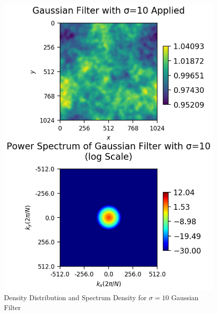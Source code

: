 \documentclass[a4paper,10pt]{article}
\begin{document}
\begin{large}
\begin{figure}[htbp] %
\centering %
\includegraphics[width=14cm]{sigma=10.png} %
\caption{Density Distribution and Spectrum Density for $\sigma=10$ Gaussian Filter}
\end{figure}


\end{large}
\end{document}
